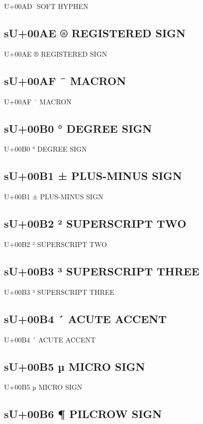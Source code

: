 U+00AD ­  SOFT HYPHEN

\subsection{sU+00AE ®  REGISTERED SIGN}

U+00AE ®  REGISTERED SIGN

\subsection{sU+00AF ¯  MACRON}

U+00AF ¯  MACRON

\subsection{sU+00B0 °  DEGREE SIGN}

U+00B0 °  DEGREE SIGN

\subsection{sU+00B1 ±  PLUS-MINUS SIGN}

U+00B1 ±  PLUS-MINUS SIGN

\subsection{sU+00B2 ²  SUPERSCRIPT TWO}

U+00B2 ²  SUPERSCRIPT TWO

\subsection{sU+00B3 ³  SUPERSCRIPT THREE}

U+00B3 ³  SUPERSCRIPT THREE

\subsection{sU+00B4 ´  ACUTE ACCENT}

U+00B4 ´  ACUTE ACCENT

\subsection{sU+00B5 µ  MICRO SIGN}

U+00B5 µ  MICRO SIGN

\subsection{sU+00B6 ¶  PILCROW SIGN}

